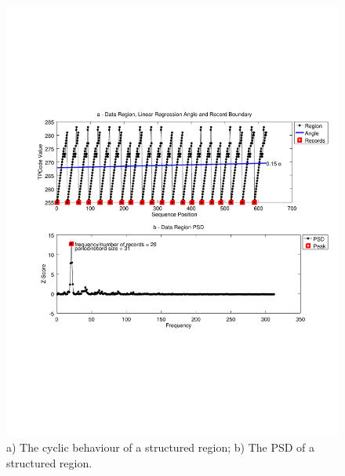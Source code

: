 \documentclass{vldb}
\begin{document}
\begin{figure}[h]
  \centering
     \includegraphics[trim={2.5cm 7.5cm 1cm 6.5cm}, width=\linewidth
     ]{img/fftreg.pdf}
  \caption{a) The cyclic behaviour of a structured region; b) The PSD of a
  structured region.}
  \label{fig:fftreg}
\end{figure}
\end{document}
